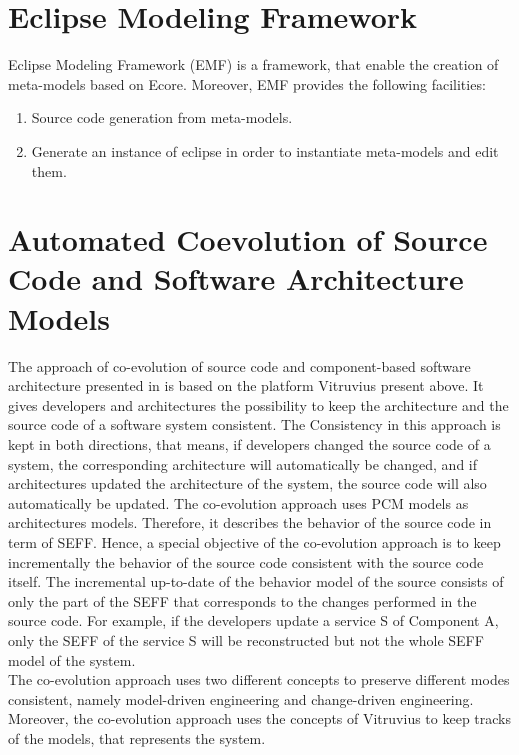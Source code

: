 \section{Eclipse Modeling Framework}
\label{sec:Eclipse Modeling Framework}
Eclipse Modeling Framework (EMF) is a framework, that enable the creation of meta-models based on Ecore. Moreover, EMF provides the following facilities:
\begin{enumerate}
\item Source code generation from meta-models. 
\item Generate an instance of eclipse in order to instantiate meta-models and edit them.
\end{enumerate}

\section{Automated Coevolution of Source Code and Software Architecture Models}
\label{sec:Automated Coevolution of Source Code and Software Architecture Models}
The approach of co-evolution of source code and component-based software architecture presented in \cite{langhammer2015co, langhammer2017automated} is based on the platform Vitruvius present above. It gives developers and architectures the possibility to keep the architecture and the source code of a software system consistent. The Consistency in this approach is kept in both directions, that means, if developers changed the source code of a system, the corresponding architecture will automatically be changed, and if architectures updated the architecture of the system, the source code will also automatically be updated. The co-evolution approach uses PCM models as architectures models.  Therefore, it describes the behavior of the source code in term of SEFF. Hence, a special objective of the co-evolution approach is to keep incrementally the behavior of the source code consistent with the source code itself. The incremental up-to-date of the behavior model of the source consists of only the part of the SEFF that corresponds to the changes performed in the source code. For example, if the developers update a service S of Component A, only the SEFF of the service S will be reconstructed but not the whole SEFF model of the system. \\

The co-evolution approach uses two different concepts to preserve different modes consistent, namely model-driven engineering and change-driven engineering. Moreover, the co-evolution approach uses the concepts of Vitruvius to keep tracks of the models, that represents the system. \\

